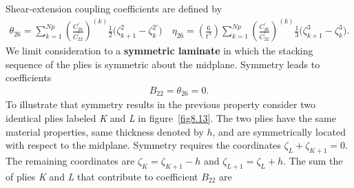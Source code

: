 \documentclass{AeroStructure-ERJohnson}
\begin{document}
Shear-extension coupling coefficients are defined by
\begin{align}\label{eq8.162}
\theta_{26}=\sum_{k=1}^{Np}\left(\frac{C_{26}^{\prime}}{C_{22}^{\prime}}\right)^{(k)}
\frac{1}{2}\big(\zeta_{k+1}^{2}-\zeta_{k}^{2'}\big) \quad
\eta_{26}=\left(\frac{6}{t^{3}}\right) \sum_{k=1}^{Np}\left(\frac{C_{26}^{\prime}}{C_{22}^{\prime}}\right)^{(k)}
\frac{1}{3}\big(\zeta_{k+1}^{3}-\zeta_{k}^{3}\big).
\end{align}
We limit consideration to a \textbf{symmetric laminate} in which
the stacking sequence of the plies is symmetric about the
midplane. Symmetry leads to coefficients
\begin{align}\label{eq8.163}
B_{22}=\theta_{26}=0.
\end{align}
To illustrate that symmetry results in the previous property
consider two identical plies labeled \textit{K} and \textit{L} in
figure~\ref{fig8.13}. The two plies have the same material properties,
same thickness denoted by $h$, and are symmetrically located with
respect to the midplane. Symmetry requires the coordinates
$\zeta_{L}+ \zeta_{K+1}=0$. The remaining coordinates are
$\zeta_{K}=\zeta_{K+1}-h$ and $\zeta_{L+1}=\zeta_{L}+h$. The sum
the of plies \textit{K} and \textit{L} that contribute to
coefficient $B_{22}$ are

\vspace*{-10pt}


\vspace*{-2.5pc}
\end{document}
